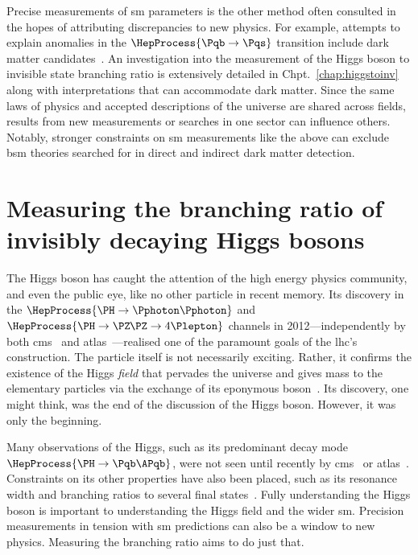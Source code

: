 Precise measurements of \acrlong{sm} parameters is the other method often consulted in the hopes of attributing discrepancies to new physics. For example, attempts to explain anomalies in the $\HepProcess{\Pqb \to \Pqs}$ transition include dark matter candidates~\cite{Vicente:2018xbv,another_b_s_anomaly_paper}. An investigation into the measurement of the Higgs boson to invisible state branching ratio is extensively detailed in Chpt.~\ref{chap:higgstoinv} along with interpretations that can accommodate dark matter. Since the same laws of physics and accepted descriptions of the universe are shared across fields, results from new measurements or searches in one sector can influence others. Notably, stronger constraints on \acrlong{sm} measurements like the above can exclude \acrshort{bsm} theories searched for in direct and indirect dark matter detection.




\section{Measuring the branching ratio of invisibly decaying Higgs bosons}
\label{sec:theory_higgs_to_inv}

The Higgs boson has caught the attention of the high energy physics community, and even the public eye, like no other particle in recent memory. Its discovery in the $\HepProcess{\PH \to \Pphoton\Pphoton}$ and $\HepProcess{\PH \to \PZ\mkern-1mu\PZ \to \text{4}\Plepton}$ channels in 2012---independently by both \acrshort{cms}~\cite{Chatrchyan:2012xdj} and \acrshort{atlas}~\cite{Aad:2012tfa}---realised one of the paramount goals of the \acrshort{lhc}'s construction. The particle itself is not necessarily exciting. Rather, it confirms the existence of the Higgs \emph{field} that pervades the universe and gives mass to the elementary particles via the exchange of its eponymous boson~\cite{PhysRevLett.13.321,PhysRevLett.13.508,PhysRevLett.13.585}. Its discovery, one might think, was the end of the discussion of the Higgs boson. However, it was only the beginning.

Many observations of the Higgs, such as its predominant decay mode $\HepProcess{\PH \to \Pqb\APqb}$, were not seen until recently by \acrshort{cms}~\cite{Sirunyan:2018kst} or \acrshort{atlas}~\cite{Aaboud:2018zhk}. Constraints on its other properties have also been placed, such as its resonance width and branching ratios to several final states~\cite{PhysRevD.98.030001}. Fully understanding the Higgs boson is important to understanding the Higgs field and the wider \acrlong{sm}. Precision measurements in tension with \acrshort{sm} predictions can also be a window to new physics. Measuring the \higgstoinv branching ratio aims to do just that.

